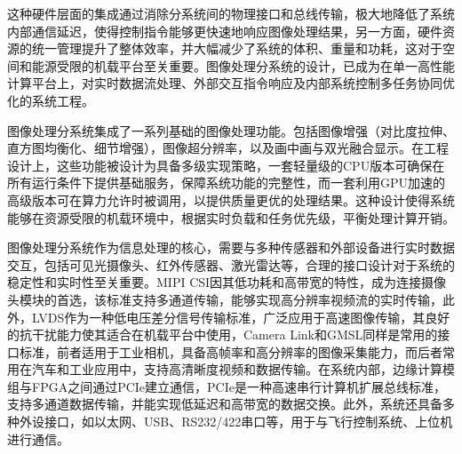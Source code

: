 这种硬件层面的集成通过消除分系统间的物理接口和总线传输，极大地降低了系统内部通信延迟，使得控制指令能够更快速地响应图像处理结果，另一方面，硬件资源的统一管理提升了整体效率，并大幅减少了系统的体积、重量和功耗，这对于空间和能源受限的机载平台至关重要。图像处理分系统的设计，已成为在单一高性能计算平台上，对实时数据流处理、外部交互指令响应及内部系统控制多任务协同优化的系统工程。

图像处理分系统集成了一系列基础的图像处理功能。包括图像增强（对比度拉伸、直方图均衡化、细节增强），图像超分辨率，以及画中画与双光融合显示。在工程设计上，这些功能被设计为具备多级实现策略，一套轻量级的CPU版本可确保在所有运行条件下提供基础服务，保障系统功能的完整性，而一套利用GPU加速的高级版本可在算力允许时被调用，以提供质量更优的处理结果。这种设计使得系统能够在资源受限的机载环境中，根据实时负载和任务优先级，平衡处理计算开销。

图像处理分系统作为信息处理的核心，需要与多种传感器和外部设备进行实时数据交互，包括可见光摄像头、红外传感器、激光雷达等，合理的接口设计对于系统的稳定性和实时性至关重要。MIPI CSI因其低功耗和高带宽的特性，成为连接摄像头模块的首选，该标准支持多通道传输，能够实现高分辨率视频流的实时传输，此外，LVDS作为一种低电压差分信号传输标准，广泛应用于高速图像传输，其良好的抗干扰能力使其适合在机载平台中使用，Camera Link和GMSL同样是常用的接口标准，前者适用于工业相机，具备高帧率和高分辨率的图像采集能力，而后者常用在汽车和工业应用中，支持高清晰度视频和数据传输。在系统内部，边缘计算模组与FPGA之间通过PCIe建立通信，PCIe是一种高速串行计算机扩展总线标准，支持多通道数据传输，并能实现低延迟和高带宽的数据交换。此外，系统还具备多种外设接口，如以太网、USB、RS232/422串口等，用于与飞行控制系统、上位机进行通信。




